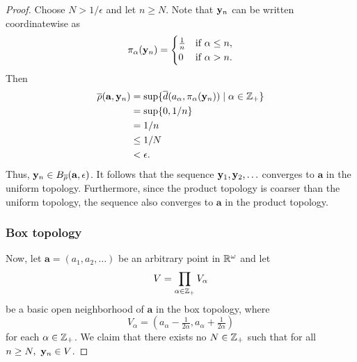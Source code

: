 \begin{solution}
\begin{proof}
        Choose $N > 1 / \epsilon$ and let $n \geq N$.
        Note that $\mathbf{y}_n$ can be written coordinatewise as
        \begin{equation*}
            \pi_\alpha(\mathbf{y}_n) = \begin{cases}
                \tfrac{1}{n}  & \text{if } \alpha \leq n, \\
                0             & \text{if } \alpha > n.
            \end{cases}
        \end{equation*}
        Then 
        \begin{align*}
          \overline{\rho}(\mathbf{a}, \mathbf{y}_n)  &= \sup\{\overline{d}(a_\alpha, \pi_\alpha(\mathbf{y}_n)) \mid \alpha \in \mathbb{Z}_+\} \\
                                              &= \sup\{0, 1/n\} \\
                                              &= 1/n \\
                                              &\leq 1/N \\
                                              &< \epsilon.
        \end{align*}
        Thus, $\mathbf{y}_n \in B_{\overline{\rho}}(\mathbf{a}, \epsilon)$.
        It follows that the sequence $\mathbf{y}_1, \mathbf{y}_2, \ldots$ converges to $\mathbf{a}$ in the uniform topology.
        Furthermore, since the product topology is coarser than the uniform topology, the sequence also converges to $\mathbf{a}$ in the product topology.

        \subsubsection*{Box topology}
        Now, let $\mathbf{a} = (a_1, a_2, \ldots)$ be an arbitrary point in $\mathbb{R}^\omega$ and let
        \begin{equation*}
            V = \prod_{\alpha\in\mathbb{Z}_+} V_\alpha
        \end{equation*}
        be a basic open neighborhood of $\mathbf{a}$ in the box topology, where 
        \begin{equation*}
            V_\alpha = (a_\alpha - \tfrac{1}{2\alpha}, a_\alpha + \tfrac{1}{2\alpha})
        \end{equation*}
        for each $\alpha \in \mathbb{Z}_+$.
        We claim that there exists no $N \in \mathbb{Z}_+$ such that for all $n \geq N,~ \mathbf{y}_n \in V$.


\end{proof}
\end{solution}
